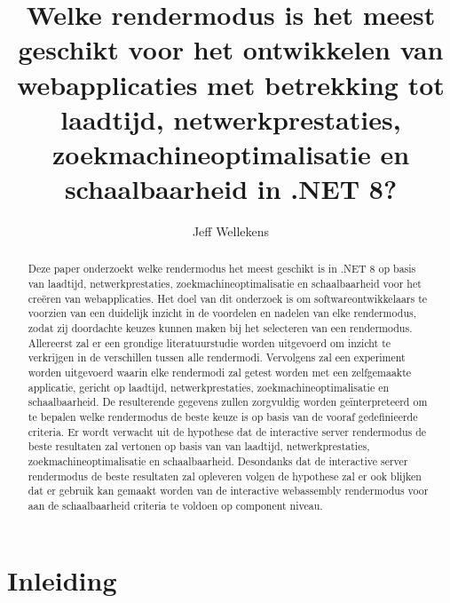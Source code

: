 \documentclass{hogent-article}
\title{Welke rendermodus is het meest geschikt voor het ontwikkelen van webapplicaties met betrekking tot laadtijd, netwerkprestaties, zoekmachineoptimalisatie en schaalbaarheid in .NET 8?}
\author{Jeff Wellekens}
\begin{document}
\begin{abstract}
  Deze paper onderzoekt welke rendermodus het meest geschikt is in .NET 8 op basis
  van laadtijd, netwerkprestaties, zoekmachineoptimalisatie en schaalbaarheid voor het creëren van webapplicaties. 
  Het doel van dit onderzoek is om softwareontwikkelaars te voorzien van een duidelijk inzicht in de voordelen en nadelen van
  elke rendermodus, zodat zij doordachte keuzes kunnen maken bij het selecteren van een rendermodus. Allereerst zal er een grondige literatuurstudie 
  worden uitgevoerd om inzicht te verkrijgen in de verschillen tussen alle rendermodi. 
  Vervolgens zal een experiment worden uitgevoerd waarin elke rendermodi zal getest worden met een zelfgemaakte applicatie, gericht op laadtijd, netwerkprestaties, zoekmachineoptimalisatie en schaalbaarheid.
  De resulterende gegevens zullen zorgvuldig worden geïnterpreteerd om te bepalen welke rendermodus de beste keuze is op basis van de vooraf gedefinieerde criteria. 
  Er wordt verwacht uit de hypothese dat de interactive server rendermodus de beste resultaten zal vertonen op basis van van laadtijd, netwerkprestaties, zoekmachineoptimalisatie en schaalbaarheid. Desondanks
  dat de interactive server rendermodus de beste resultaten zal opleveren volgen de hypothese zal er ook blijken dat er gebruik kan gemaakt worden van de interactive webassembly rendermodus voor aan
  de schaalbaarheid criteria te voldoen op component niveau. 
\end{abstract}

\tableofcontents

\bigskip





\section{Inleiding}%
\label{sec:inleiding}
\end{document}
